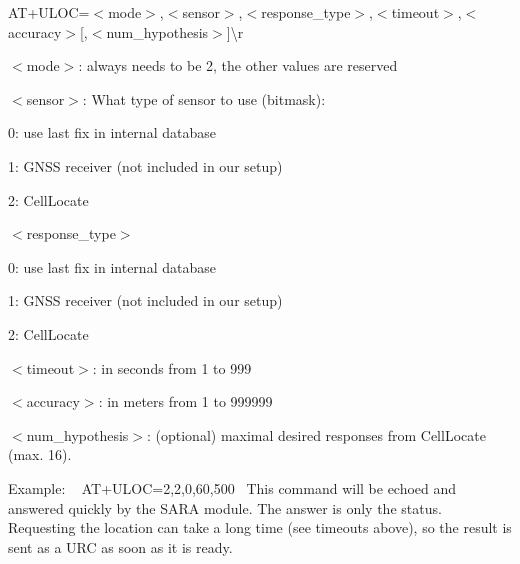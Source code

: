 {\ttfamily A\+T+\+U\+L\+OC=$<$mode$>$,$<$sensor$>$,$<$response\+\_\+type$>$,$<$timeout$>$,$<$accuracy$>$\mbox{[},$<$num\+\_\+hypothesis$>$\mbox{]}\textbackslash{}r}~\newline

\begin{DoxyItemize}
\item $<$mode$>$\+: always needs to be 2, the other values are reserved~\newline

\item $<$sensor$>$\+: What type of sensor to use (bitmask)\+: ~\newline

\begin{DoxyItemize}
\item 0\+: use last fix in internal database~\newline

\item 1\+: G\+N\+SS receiver (not included in our setup)~\newline

\item 2\+: Cell\+Locate~\newline

\end{DoxyItemize}
\item $<$response\+\_\+type$>$ ~\newline

\begin{DoxyItemize}
\item 0\+: use last fix in internal database~\newline

\item 1\+: G\+N\+SS receiver (not included in our setup)~\newline

\item 2\+: Cell\+Locate~\newline

\end{DoxyItemize}
\item $<$timeout$>$\+: in seconds from 1 to 999
\item $<$accuracy$>$\+: in meters from 1 to 999999
\item $<$num\+\_\+hypothesis$>$\+: (optional) maximal desired responses from Cell\+Locate (max. 16).
\end{DoxyItemize}

Example\+: ~\newline
 {\ttfamily A\+T+\+U\+L\+OC=2,2,0,60,500}~\newline
 This command will be echoed and answered quickly by the S\+A\+RA module. The answer is only the status. Requesting the location can take a long time (see timeouts above), so the result is sent as a U\+RC as soon as it is ready.

